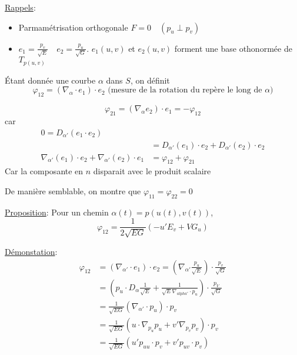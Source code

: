 



\underline{Rappels}: 

\begin{itemize}
\item Parmamétrisation orthogonale $F=0 \quad (p_u \perp p_v)$ 
\item $e_1 = \frac{p_v}{\sqrt{E}} \quad e_2 = \frac{p_u}{\sqrt{G}}$. $e_1 (u,v) $ et $e_2 (u,v)$ forment une base othonormée de $T_{p(u,v)}$   
\end{itemize}

Étant donnée une courbe $\alpha$ dans $S$, on définit $$\varphi_{12} = (\nabla_{\alpha} \cdot e_{1}) \cdot e_2 \text{ (mesure de la rotation du repère le long de } \alpha)  $$    

\begin{tcolorbox}[title=Remarque]
	 $$\varphi_{21} = (\nabla_{\alpha} e_{2}) \cdot e_1 = - \varphi_{12}$$ car \begin{align*}
	 	0 = D_{\alpha'} (e_1 \cdot  e_2 ) \\ &= D_{\alpha'} (e_1 ) \cdot e_2 + D_{\alpha'} (e_2 ) \cdot  e_2  \\ \nabla_{\alpha'} (e_1 ) \cdot  e_2 + \nabla_{\alpha'}(e_2 ) \cdot e_1 &= \varphi_{12} + \varphi_{21} 
	 \end{align*} Car la composante en $n$ disparait avec le produit scalaire 

	 De manière semblable, on montre que $\varphi_{11} = \varphi_{22} =0$ 
\end{tcolorbox}


\underline{Proposition}: Pour un chemin $\alpha(t) = p(u(t), v(t))$, $$\varphi_{12} = \frac{1}{2\sqrt{EG}} (-u' E_v + VG_u)$$  

\underline{Démonstation}: \begin{align*}
	\varphi_{12} &= (\nabla_{\alpha'} \cdot e_{1}) \cdot  e_2= \left( \nabla_{\alpha'} \frac{p_u}{\sqrt{E}}  \right) \cdot  \frac{p_v}{\sqrt{G}}\\ &= \left( p_u \cdot  D_{\alpha} \frac{1}{\sqrt{E}} + \frac{1}{\sqrt{E} \nabla_{alpha'} \cdot  p_u}  \right) \cdot \frac{p_V}{\sqrt{G}}\\ &= \frac{1}{\sqrt{EG}} \left( \nabla_{\alpha'}\cdot  p_u \right) \cdot p_v\\ &= \frac{1}{\sqrt{EG}} \left( u \cdot \nabla_{p_u} p_u + v' \nabla_{p_v} p_v \right) \cdot p_v \\ &= \frac{1}{\sqrt{EG}} \left( u' p_{uu} \cdot p_v + v' p_{uv} \cdot p_v  \right)
\end{align*}

